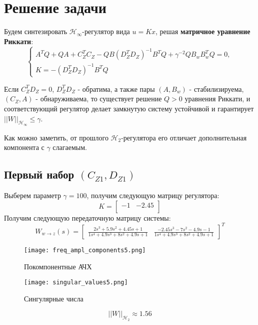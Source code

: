 \section{Решение задачи}


Будем синтезировать $\mathcal{H}_\infty$-регулятор вида $u=Kx$, решая \textbf{матричное уравнение Риккати}:
$$
    \begin{cases}
        A^T Q + QA + C^T_Z C_Z - QB(D^T_Z D_Z)^{-1} B^T Q  + \gamma^{-2}QB_w B^T_w Q= 0, \\
        K = -(D^T_Z D_Z)^{-1} B^T Q
    \end{cases}
$$

Если $C_Z^T D_Z = 0$, $D^T_Z D_Z$ - обратима, а также пары $(A, B_w)$ - стабилизируема, 
$(C_Z, A)$ - обнаруживаема, то существует решение $Q > 0$ уравнения Риккати, и соответствующий регулятор
делает замкнутую систему устойчивой и гарантирует $||W||_{\mathcal{H}_\infty} \leq \gamma$.

Как можно заметить, от прошлого $\mathcal{H}_2$-регулятора его отличает дополнительная компонента с $\gamma$ слагаемым.

\newpage
\subsection{Первый набор $(C_{Z1},D_{Z1})$}


Выберем параметр $\gamma = 100$, получим следующую матрицу регулятора: 
$$
    K = \begin{bmatrix}
        -1 & -2.45 \\
    \end{bmatrix}
$$
Получим следующую передаточную матрицу системы:
$$
    W_{w\rightarrow z}(s) = \begin{bmatrix}\frac{2s^{3} + 5.9s^{2} + 4.45s + 1}{1s^{4} + 4.9s^{3} + 8s^{2} + 4.9s + 1} & \frac{-2.45s^{3} - 7s^{2} - 4.9s - 1}{1s^{4} + 4.9s^{3} + 8s^{2} + 4.9s + 1} \end{bmatrix}^T
$$

\begin{figure}[ht]
    \centering
    \texttt{[image: freq\_ampl\_components5.png]}
    \caption{Покомпонентные АЧХ}
  \end{figure}
\begin{figure}[ht]
  \centering
  \texttt{[image: singular\_values5.png]}
  \caption{Сингулярные числа}
\end{figure}

$$
    ||W||_{\mathcal{H}_2} \approx 1.56
$$

